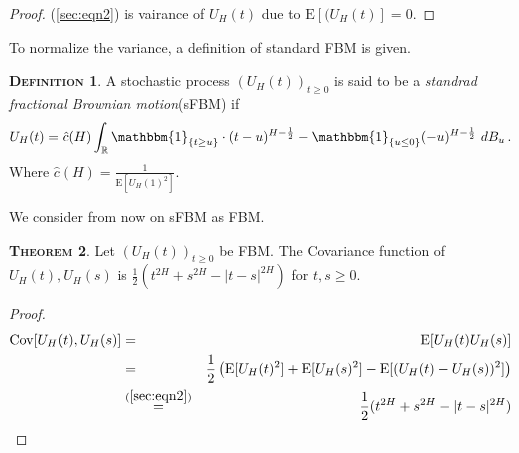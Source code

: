 \documentclass[a4paper, twoside, 11pt]{article}
\theoremstyle{definition}
\newtheorem{definition}{\scshape Definition}[section]
\newtheorem{theorem}[definition]{\scshape Theorem}
\newcommand{\brkt}[1]{\left({#1} \right)}
\begin{document}
\begin{proof}
  (\ref{sec:eqn2}) is vairance of $U_H(t)$ due to $\mathrm{E}[(U_H(t)] = 0$.
\end{proof}
To normalize the variance, a definition of standard FBM is given.

\begin{definition}
  A stochastic process $(U_H(t))_{t\ge 0}$ is said to be a \emph{standrad fractional Brownian motion}(sFBM) if
  \begin{equation}
U_H(t) = \hat{c}(H) \int_{\mathbb{R}} \mathbbm{1}_{\{t\ge u\}}\cdot (t-u)^{H-\frac{1}{2}} - \mathbbm{1}_{\{u\le 0\}} (-u)^{H-\frac{1}{2}} \, \mathop{dB_u}.
\label{sec:eqn3}
\end{equation}
Where $\hat{c}(H) = \frac{1}{\mathrm{E}[U_H(1)^2]} $.
\end{definition}
We consider from now on sFBM as FBM.

\begin{theorem}
 Let  $(U_H(t))_{t\ge 0}$ be FBM. The Covariance function of $U_H(t), U_H(s)$ is $ \frac{1}{2}(t^{2H} + s^{2H} - |t-s|^{2H})$ for $t, s \ge 0$.
\end{theorem}

\begin{proof}
  \begin{eqnarray}
	\mathrm{Cov}[U_H(t), U_H(s)] &=& \mathrm{E}[U_H(t)U_H(s)] \nonumber\\
	&=& \frac{1}{2}\brkt{\mathrm{E}[U_H(t)^2] + \mathrm{E}[U_H(s)^2] - \mathrm{E}[(U_H(t) - U_H(s))^2]} \nonumber\\
	&\overset{(\ref{sec:eqn2})}{=}& \frac{1}{2}(t^{2H} + s^{2H} - |t-s|^{2H})
	\label{sec:eqn4}
  \end{eqnarray}
\end{proof}
\end{document}
